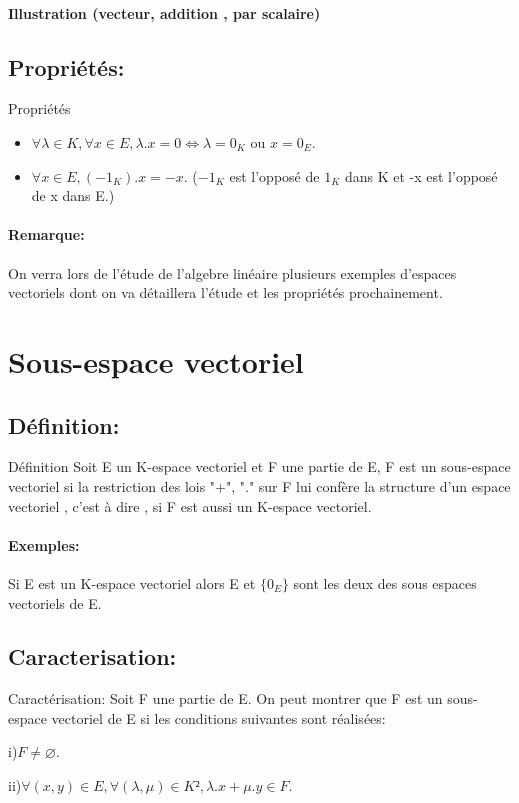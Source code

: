 \documentclass{book}
\begin{document}
\paragraph{Illustration (vecteur, addition , par scalaire)}
\subsection{Propriétés:}
\begin{Propriété}[]{Propriétés}{}
\begin{itemize}
    \item \(\forall \lambda \in K, \forall x \in E, \lambda.x = 0 \Leftrightarrow \lambda=0_K \) ou \(x=0_E.\)
    \item \(\forall x \in E, (-1_K).x=-x.\) (\(-1_K\) est l'opposé de \(1_K\) dans K et -x est l'opposé de x dans E.)
\end{itemize}

\end{Propriété}
\paragraph{Remarque: }
On verra lors de l'étude de l'algebre linéaire plusieurs exemples d'espaces vectoriels dont on va détaillera l'étude et les propriétés prochainement.

\section{Sous-espace vectoriel}
\subsection{Définition:}
\begin{Définition}[]{Définition}{}
Soit E un K-espace vectoriel et F une partie de E, F est un sous-espace vectoriel si la restriction des lois "+", "." sur F lui confère la structure d'un espace vectoriel , c'est à dire , si F est aussi un K-espace vectoriel.
\end{Définition}
\paragraph{Exemples: }
Si E est un K-espace vectoriel alors E et \(\{0_E\}\) sont les deux des sous espaces vectoriels de E.
\subsection{Caracterisation:}
\begin{Propriété}[]{Caractérisation: }
Soit F une partie de E. On peut montrer que F est un sous-espace vectoriel  de E si les conditions suivantes sont réalisées:

i)\(F \neq \varnothing. \)

ii)\(\forall (x,y) \in E, \forall (\lambda, \mu) \in K², \lambda.x+\mu.y \in F. \)
\end{Propriété}
\end{document}
